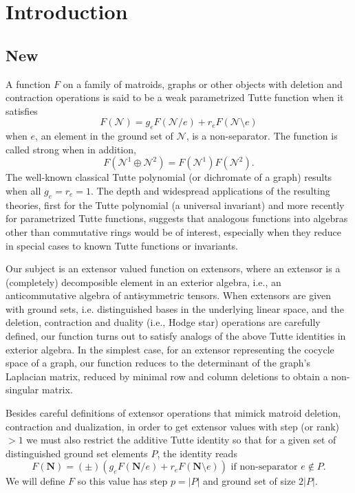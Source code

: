 \documentclass[12pt]{article}
\theoremstyle{definition}
\newcommand{\ext}[1]{\ensuremath{\mathbf{#1}}}
\begin{document}
\newpage

\tableofcontents

\section{Introduction}


\subsection{New}

A function $F$ on a family of 
matroids, graphs or other objects with
deletion and contraction operations is 
said to be a weak parametrized Tutte 
function when it satisfies
\[ F(\mathcal{N}) = g_e F(\mathcal{N}/e) + r_e F(\mathcal{N}\setminus e) \]
when $e$, an element in the ground set
of $\mathcal{N}$,  is a non-separator.  The function is called 
strong when in addition,
\[ F(\mathcal{N}^1\oplus\mathcal{N}^2) = F(\mathcal{N}^1) F(\mathcal{N}^2). \]
The well-known classical Tutte polynomial (or dichromate of a graph)
results when all $g_e=r_e=1$.  The depth and widespread applications
of the resulting theories, first for the Tutte polynomial (a universal
invariant) and more recently
for parametrized Tutte functions, suggests that analogous functions
into algebras other than commutative rings would be of interest,
especially when they reduce in special cases
to known Tutte functions or invariants.

Our subject is an extensor valued function on extensors, where
an extensor is a (completely) decomposible element in an exterior
algebra, i.e., an anticommutative algebra of antisymmetric tensors.
When extensors are given with ground sets, i.e. distinguished
bases in the underlying linear space, and the deletion, contraction
and duality (i.e., Hodge star) operations are carefully defined,
our function turns out to satisfy analogs of the above Tutte identities
in exterior algebra.  In the simplest case, for an extensor
representing the cocycle space of a graph, our function reduces
to the determinant of the graph's Laplacian matrix, reduced by
minimal row and column deletions to obtain a non-singular matrix.

Besides careful definitions of extensor operations that mimick
matroid deletion, contraction and dualization, in order to
get extensor values with step (or rank) $> 1$ we must also
restrict the additive Tutte identity so that for a given
set of distinguished ground set elements $P$, the identity
reads
\[
F(\ext{N})=(\pm)(g_e F(\ext{N}/e) + r_e F(\ext{N}\setminus e))
\text{ if non-separator }e\not\in P.
\]
We will define $F$ so this value has step $p=|P|$ and ground set
of size $2|P|$.
\end{document}
